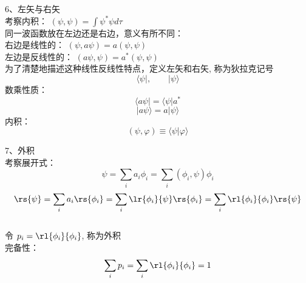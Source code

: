 \begin{frame}{}
    6、左矢与右矢\\
    考察内积： $(\psi,\psi)=\int\psi^*\psi d\tau$ \\
    同一波函数放在左边还是右边，意义有所不同： \\
    右边是线性的：  $(\psi,a\psi)=a (\psi,\psi)$ \\
    左边是反线性的：   $(a\psi,\psi)=a^* (\psi,\psi)$  \\
    为了清楚地描述这种线性反线性特点，定义左矢和右矢, 称为狄拉克记号
    $$\langle \psi |, \qquad |\psi \rangle $$ 
    数乘性质： $$\langle a\psi | = \langle \psi |a^* $$
    $$ |a\psi \rangle = a|\psi \rangle$$ 
    内积：\[(\psi,\varphi)\equiv \langle \psi | \varphi \rangle\]
\end{frame}

\begin{frame}{}
    7、外积\\
    考察展开式： \[\psi=\sum_i a_i \phi_i= \sum_i (\phi_i,\psi) \phi_i\]
    \[\rs{\psi}=\sum_i a_i \rs{\phi_i}= \sum_i \lr{\phi_i}{\psi} \rs{\phi_i} =\sum_i \rl{\phi_i}{\phi_i} \rs{\psi}\]
    ~~\\
    令 $p_i= \rl{\phi_i}{\phi_i} $, 称为外积\\ {\vspace*{1em}}
    完备性：
    \[\sum_i p_i= \sum_i \rl{\phi_i}{\phi_i}=1 \]
\end{frame}

